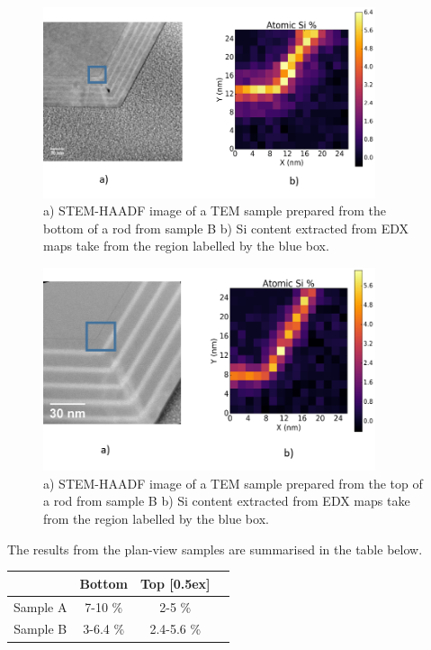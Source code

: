 \begin{figure}[!h]
	\centering
	\includegraphics[width=0.87\textwidth]{Figs/Ch6/B-bot-EDX}
	\caption{a) STEM-HAADF image of a TEM sample prepared from the bottom of a rod from sample B b) Si content extracted from EDX maps take from the region labelled by the blue box.}
	\label{BbotEDX}
\end{figure}
\FloatBarrier 
\begin{figure}[!h]
	\centering
	\includegraphics[width=0.87\textwidth]{Figs/Ch6/B-top-EDX}
	\caption{a) STEM-HAADF image of a TEM sample prepared from the top of a rod from sample B b) Si content extracted from EDX maps take from the region labelled by the blue box.}
	\label{BtopEDX}
\end{figure}
\FloatBarrier 

The results from the plan-view samples are summarised in the table below.

\begin{minipage}{\linewidth}
	\centering
	 \label{tab:title} 
	\begin{tabular}{c c c c} 
		\hline 
		 & Bottom & Top [0.5ex] \\
		\hline\hline 
		Sample A & 7-10 \% & 2-5 \%  \\
		\hline
		Sample B & 3-6.4 \% & 2.4-5.6 \% \\
		\hline
	\end{tabular}
	\bigskip
\end{minipage}

